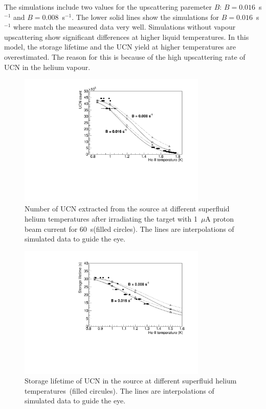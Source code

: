 The simulations include two values for the upscattering paremeter $B$:
$B= 0.016$~s$^{-1}$ and $B= 0.008$~s$^{-1}$. The lower solid lines
show the simulations for $B= 0.016$~s$^{-1}$ where match the measured
data very well. Simulations without vapour upscattering show
significant differences at higher liquid temperatures. In this model,
the storage lifetime and the UCN yield at higher temperatures are
overestimated. The reason for this is because of the high upscattering
rate of UCN in the helium vapour.
\begin{figure}[h!]
  \centering
  \includegraphics[width=0.8\textwidth]{UCNCounts_vs_Temperature.pdf}
  \caption{Number of UCN extracted from the source at different
    superfluid helium temperatures after irradiating the target with
    1~$\mu$A proton beam current for 60~s(filled circles). The lines
    are interpolations of simulated data to guide the eye.}
  \label{fig:Counts_vs_temp_sim}
\end{figure}

\begin{figure}[h!]
  \centering
  \includegraphics[width=0.8\textwidth]{Storagelifetime_vs_Temp.pdf}
  \caption{Storage lifetime of UCN in the source at different
    superfluid helium temperatures~(filled circules). The lines are
    interpolations of simulated data to guide the eye.}
  \label{fig:storage_vs_temp_sim}
\end{figure}

